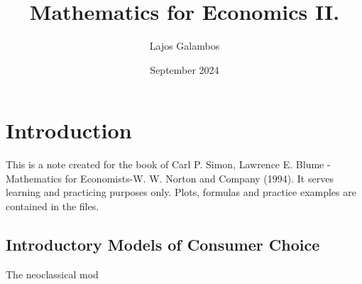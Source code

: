\documentclass{article}
\title{Mathematics for Economics II.}
\author{Lajos Galambos}
\date{September 2024}
\begin{document}
\maketitle

\section{Introduction}

This is a note created for the book of Carl P. Simon, Lawrence E. Blume - Mathematics for Economists-W. W. Norton and Company (1994). It serves learning and practicing purposes only. Plots, formulas and practice examples are contained in the files.

\subsection{Introductory Models of Consumer Choice}
The neoclassical mod
\end{document}
